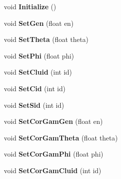 \begin{DoxyCompactItemize}
\item 
\hypertarget{classmbevts_af4d8c772143ea8de192f6b2a2b344619}{void {\bfseries Initialize} ()}\label{classmbevts_af4d8c772143ea8de192f6b2a2b344619}

\item 
\hypertarget{classmbevts_ad29cd681805c81fa079606dc50660f5a}{void {\bfseries Set\-Gen} (float en)}\label{classmbevts_ad29cd681805c81fa079606dc50660f5a}

\item 
\hypertarget{classmbevts_ab4730072411283cab109739a79f6c1ad}{void {\bfseries Set\-Theta} (float theta)}\label{classmbevts_ab4730072411283cab109739a79f6c1ad}

\item 
\hypertarget{classmbevts_a7d94f91e2f6843abb701bf3c70341c8a}{void {\bfseries Set\-Phi} (float phi)}\label{classmbevts_a7d94f91e2f6843abb701bf3c70341c8a}

\item 
\hypertarget{classmbevts_a599ac04245c6c4d92312756c629701ec}{void {\bfseries Set\-Cluid} (int id)}\label{classmbevts_a599ac04245c6c4d92312756c629701ec}

\item 
\hypertarget{classmbevts_a7316bdb2d5d95d678a80760acccf8e9b}{void {\bfseries Set\-Cid} (int id)}\label{classmbevts_a7316bdb2d5d95d678a80760acccf8e9b}

\item 
\hypertarget{classmbevts_a0fddb9db5add0514b2fca3785aafccbc}{void {\bfseries Set\-Sid} (int id)}\label{classmbevts_a0fddb9db5add0514b2fca3785aafccbc}

\item 
\hypertarget{classmbevts_aec472130dcb49b23b67fd33502169ce4}{void {\bfseries Set\-Cor\-Gam\-Gen} (float en)}\label{classmbevts_aec472130dcb49b23b67fd33502169ce4}

\item 
\hypertarget{classmbevts_ab373117c8febf8133be23059f33c0d96}{void {\bfseries Set\-Cor\-Gam\-Theta} (float theta)}\label{classmbevts_ab373117c8febf8133be23059f33c0d96}

\item 
\hypertarget{classmbevts_a0a51dd0938ca775981cfbc28f5a89c9d}{void {\bfseries Set\-Cor\-Gam\-Phi} (float phi)}\label{classmbevts_a0a51dd0938ca775981cfbc28f5a89c9d}

\item 
\hypertarget{classmbevts_aef729d6b8949fabf8d2f046de428932e}{void {\bfseries Set\-Cor\-Gam\-Cluid} (int id)}\label{classmbevts_aef729d6b8949fabf8d2f046de428932e}


\end{DoxyCompactItemize}
